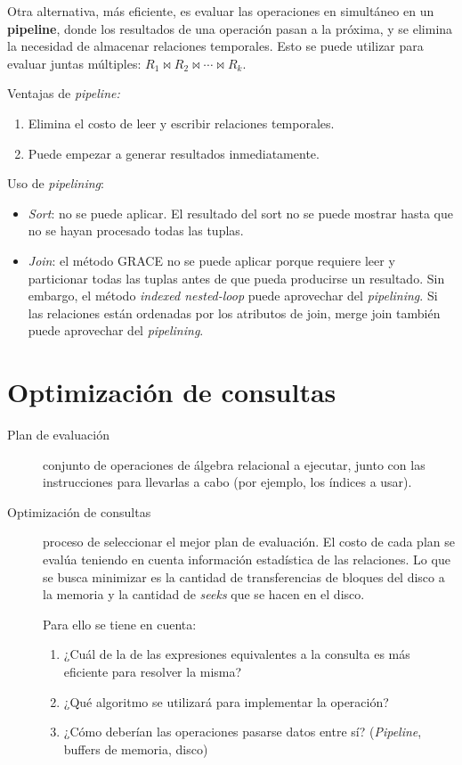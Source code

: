 \documentclass[a4paper, twoside]{article}
\begin{document}
Otra alternativa, más eficiente, es evaluar las operaciones en simultáneo en un \textbf{pipeline}, donde los resultados de una operación pasan a la próxima, y se elimina la necesidad de almacenar relaciones temporales. Esto se puede utilizar para evaluar juntas múltiples: $R_{1}\bowtie R_{2}\bowtie\cdots\bowtie R_{k}$.

Ventajas de \emph{pipeline:}
\begin{enumerate}
	\item Elimina el costo de leer y escribir relaciones temporales.
	\item Puede empezar a generar resultados inmediatamente.
\end{enumerate}

Uso de \emph{pipelining}:
\begin{itemize}
	\item \emph{Sort}: no se puede aplicar. El resultado del sort no se puede mostrar hasta que no se hayan procesado todas las tuplas.
	\item \emph{Join}: el método GRACE no se puede aplicar porque requiere leer y particionar todas las tuplas antes de que pueda producirse un resultado. Sin embargo, el método \emph{indexed nested-loop} puede aprovechar del \emph{pipelining}. Si las relaciones están ordenadas por los atributos de join, merge join también puede aprovechar del \emph{pipelining}.
\end{itemize}

\section{Optimización de consultas}
\begin{description}
	\item[Plan de evaluación] conjunto de operaciones de álgebra relacional a ejecutar, junto con las instrucciones para llevarlas a cabo (por ejemplo, los índices a usar).
	\item[Optimización de consultas] proceso de seleccionar el mejor plan de evaluación. El costo de cada plan se evalúa teniendo en cuenta información estadística de las relaciones. Lo que se busca minimizar es la cantidad de transferencias de bloques del disco a la memoria y la cantidad de \emph{seeks} que se hacen en el disco. 

	Para ello se tiene en cuenta:
	\begin{enumerate}
		\item ¿Cuál de la de las expresiones equivalentes a la consulta es más eficiente para resolver la misma?
		\item ¿Qué algoritmo se utilizará para implementar la operación?
		\item ¿Cómo deberían las operaciones pasarse datos entre sí? (\emph{Pipeline}, buffers de memoria, disco)
	\end{enumerate}
\end{description}
\end{document}
